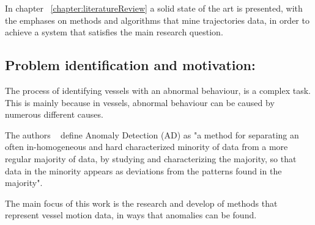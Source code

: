 In chapter ~\ref{chapter:literatureReview} a solid state of the art is presented, with the emphases on methods and algorithms that mine trajectories data, in order to achieve a system that satisfies the main research question.

\subsection{Problem identification and motivation:} 
The process of identifying vessels with an abnormal behaviour, is a complex task. This is mainly because in vessels, abnormal behaviour can be caused by numerous different causes.
  
The authors ~\cite{Laxhammar2008} define Anomaly Detection (AD) as "a method for separating an often in-homogeneous and hard characterized minority of data from a more regular majority of data, by studying and characterizing the majority, so that data in the minority appears as deviations from the patterns found in the majority". 

The main focus of this work is the research and develop of methods that represent vessel motion data, in ways that anomalies can be found.
\fi
